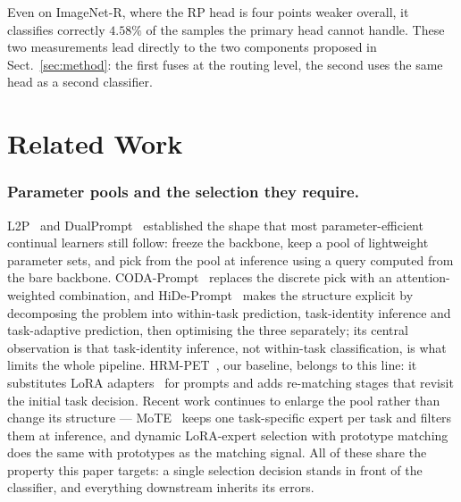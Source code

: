 \documentclass[runningheads]{llncs}
\begin{document}
Even on ImageNet-R, where the RP head is four points weaker overall, it
classifies correctly $4.58\%$ of the samples the primary head cannot handle.
These two measurements lead directly to the two components proposed in
Sect.~\ref{sec:method}: the first fuses at the routing level, the second uses
the same head as a second classifier.

\section{Related Work}
\label{sec:related}

\subsubsection{Parameter pools and the selection they require.}
L2P~\cite{ref_l2p} and DualPrompt~\cite{ref_dualprompt} established the shape
that most parameter-efficient continual learners still follow: freeze the
backbone, keep a pool of lightweight parameter sets, and pick from the pool at
inference using a query computed from the bare backbone. CODA-Prompt~\cite{ref_coda}
replaces the discrete pick with an attention-weighted combination, and
HiDe-Prompt~\cite{ref_hide} makes the structure explicit by decomposing the
problem into within-task prediction, task-identity inference and task-adaptive
prediction, then optimising the three separately; its central observation is
that task-identity inference, not within-task classification, is what limits the
whole pipeline. HRM-PET~\cite{ref_hrmpet}, our baseline, belongs to this line: it
substitutes LoRA adapters~\cite{ref_lora} for prompts and adds re-matching stages
that revisit the initial task decision. Recent work continues to enlarge the
pool rather than change its structure --- MoTE~\cite{ref_mote} keeps one
task-specific expert per task and filters them at inference, and dynamic
LoRA-expert selection with prototype matching~\cite{ref_dlepem} does the same
with prototypes as the matching signal. All of these share the property this
paper targets: a single selection decision stands in front of the classifier,
and everything downstream inherits its errors.
\end{document}
